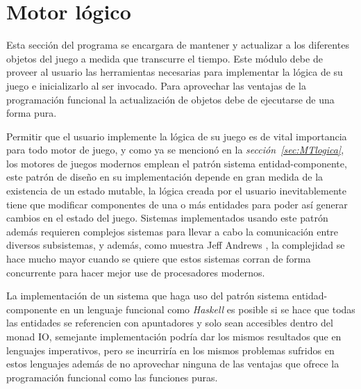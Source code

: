 

\section{Motor lógico}

Esta sección del programa se encargara de mantener y actualizar a los diferentes objetos del juego a medida que transcurre el tiempo. Este módulo debe de proveer al usuario las herramientas necesarias para implementar la lógica de su juego e inicializarlo al ser invocado. Para aprovechar las ventajas de la programación funcional la actualización de objetos debe de ejecutarse de una forma pura.

Permitir que el usuario implemente la lógica de su juego es de vital importancia para todo motor de juego, y como ya se mencionó en la \emph{sección~\ref{sec:MTlogica}}, los motores de juegos modernos emplean el patrón sistema entidad-componente, este patrón de diseño en su implementación depende en gran medida de la existencia de un estado mutable, la lógica creada por el usuario inevitablemente tiene que modificar componentes de una o más entidades para poder así generar cambios en el estado del juego. Sistemas implementados usando este patrón además requieren complejos sistemas para llevar a cabo la comunicación entre diversos subsistemas, y además, como muestra Jeff Andrews \cite{andrews2009designing}, la complejidad se hace mucho mayor cuando se quiere que estos sistemas corran de forma concurrente para hacer mejor use de procesadores modernos.

La implementación de un sistema que haga uso del patrón sistema entidad-componente en un lenguaje funcional como \emph{Haskell} es posible si se hace que todas las entidades se referencien con apuntadores y solo sean accesibles dentro del monad IO, semejante implementación podría dar los mismos resultados que en lenguajes imperativos, pero se incurriría en los mismos problemas sufridos en estos lenguajes además de no aprovechar ninguna de las ventajas que ofrece la programación funcional como las funciones puras.

